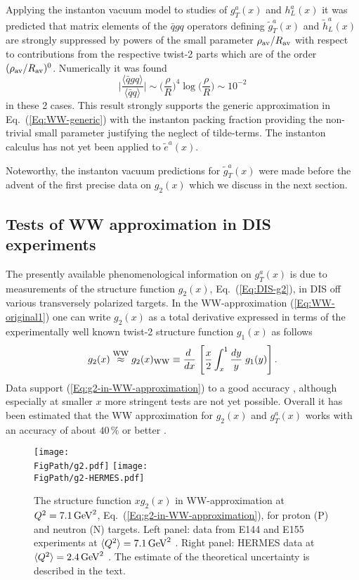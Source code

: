 \documentclass[a4paper,11pt]{article}
\newcommand{\be}{\begin{equation}}
\newcommand{\ee}{\end{equation}}
\newcommand{\la}{\langle}
\newcommand{\ra}{\rangle}
\newcommand*{\FigPath}{./figs}%
\begin{document}
Applying the instanton vacuum model to studies of $g_T^a(x)$ and $h_L^a(x)$
it was predicted that matrix elements of the $\bar qgq$ operators defining 
$\tilde{g}_T^a(x)$ \cite{Balla:1997hf} and $\tilde{h}_L^a(x)$ 
\cite{Dressler:1999hc} are strongly suppressed by powers of the small
parameter $\rho_{\rm av}/R_{\rm av}$ with respect to contributions from the 
respective twist-2 parts which are of the order $(\rho_{\rm av}/R_{\rm av})^0$. 
Numerically it was found 
\be\label{Eq:WW-instanoton}
	\biggl|\frac{\la\bar{q}gq\ra}{\la\bar{q}q\ra}\biggr| \sim 
	\biggl(\frac{\rho}{R}\biggr)^{\!4} \log\biggl(\frac{\rho}{R}\biggr)
	\sim 10^{-2}
\ee
in these 2 cases. This result strongly supports the generic approximation
in Eq.~(\ref{Eq:WW-generic}) with the instanton packing fraction providing 
the non-trivial small parameter justifying the neglect of tilde-terms. 
The instanton calculus has not yet been applied to $\tilde{e}^a(x)$.

Noteworthy, the instanton vacuum predictions for $\tilde{g}_T^a(x)$
\cite{Balla:1997hf}
were made before the advent of the first precise data on $g_2(x)$
which we discuss in the next section.

\newpage
\subsection{Tests of WW approximation in DIS experiments}
\label{Sec-3.4:WW-classic-experiment}

The presently available phenomenological information on $g_T^a(x)$ is due 
to measurements of the structure function $g_2(x)$, Eq.~(\ref{Eq:DIS-g2}),
in DIS off various transversely polarized targets. In the WW-approximation 
(\ref{Eq:WW-original1}) one can write $g_2(x)$ as a total derivative
expressed in terms of the experimentally well known twist-2
structure function $g_1(x)$ as follows
\be
    	g_2(x) \stackrel{\rm WW}{\approx} g_2(x)_{\rm WW} \equiv
	\frac{ d\;}{ d x}\;\Biggl[\frac{x}{2}\int_x^1\frac{ d y}{y}
	\;g_1(y)\Biggr]\,.\label{Eq:g2-in-WW-approximation}
\ee
Data support (\ref{Eq:g2-in-WW-approximation}) to a good accuracy
\cite{Anthony:2002hy,Abe:1998wq,Airapetian:2011wu}, although especially 
at smaller $x$ more stringent tests are not yet possible. Overall it has 
been estimated that the WW approximation for $g_2(x)$ and $g_T^a(x)$ works 
with an accuracy of about $40\,\%$ or better \cite{Accardi:2009au}. 

\begin{figure}[b!]
\centering
\texttt{[image: \\FigPath/g2.pdf]} 
\texttt{[image: \\FigPath/g2-HERMES.pdf]} 
\caption{\label{Fig:g2} 
The structure function $xg_2(x)$ in WW-approximation at $Q^2=7.1\,{\rm GeV}^2$,
Eq.~(\ref{Eq:g2-in-WW-approximation}), for proton (P) and neutron (N) targets. 
Left panel: data from E144 and E155 experiments at $\la Q^2\ra=7.1\,{\rm GeV}^2$ \cite{Anthony:2002hy,Abe:1998wq}. Right panel: HERMES data 
at $\la Q^2\ra=2.4\,{\rm GeV}^2$ \cite{Airapetian:2011wu}.
The estimate of the theoretical uncertainty is described in the text.}
\end{figure}
\end{document}
